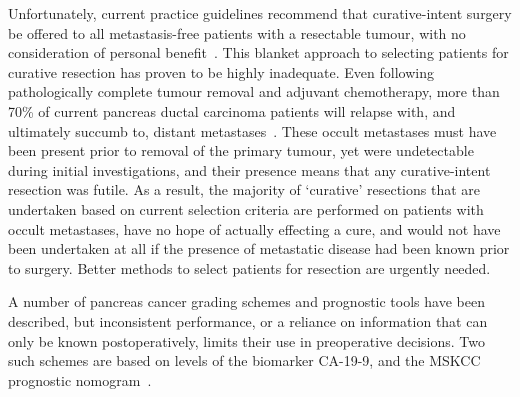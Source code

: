 \documentclass[dissertation.tex]{subfiles}
\begin{document}
Unfortunately, current practice guidelines recommend that curative-intent surgery be offered to all metastasis-free patients with a resectable tumour, with no consideration of personal benefit~\cite{Editors2015}.  This blanket approach to selecting patients for curative resection has proven to be highly inadequate.  Even following pathologically complete tumour removal and adjuvant chemotherapy, more than 70\% of current pancreas ductal carcinoma patients will relapse with, and ultimately succumb to, distant metastases~\cite{Barugola2007}.  These occult metastases must have been present prior to removal of the primary tumour, yet were undetectable during initial investigations, and their presence means that any curative-intent resection was futile.  As a result, the majority of `curative' resections that are undertaken based on current selection criteria are performed on patients with occult metastases, have no hope of actually effecting a cure, and would not have been undertaken at all if the presence of metastatic disease had been known prior to surgery.  Better methods to select patients for resection are urgently needed.


A number of pancreas cancer grading schemes and prognostic tools have been described, but inconsistent performance, or a reliance on information that can only be known postoperatively, limits their use in preoperative decisions.  Two such schemes are based on levels of the biomarker \gls{CA-19-9}, and the \gls{MSKCC} prognostic nomogram~\cite{Brennan2004}.
\end{document}
